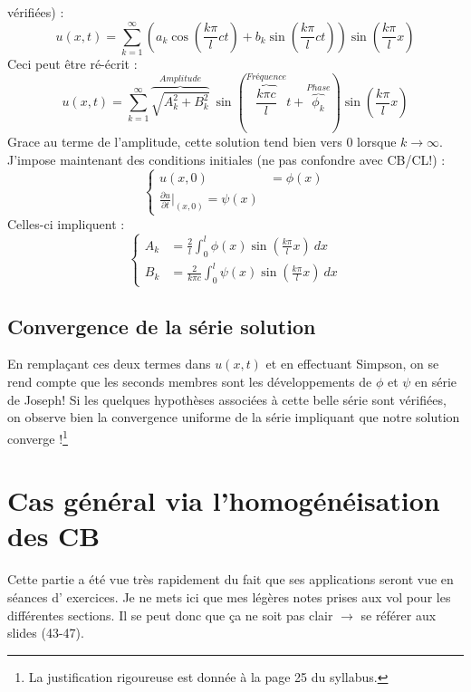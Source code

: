 \documentclass[11pt, a4paper, openany]{book}
\newcommand{\serie}{\sum_{k=1}^\infty}
\begin{document}
			vérifiées) :
			\begin{equation}
				u(x,t) = \serie\left(a_k\cos\left(\frac{k\pi}{l}ct\right)+b_k\sin\left(\frac{k\pi}{l}ct\right)
				\right)\sin\left(\frac{k\pi}{l}x\right)
			\end{equation}
			Ceci peut être ré-écrit :
			\begin{equation}
				u(x,t) = \serie \overbrace{\sqrt{A_k^2 + B_k^2}}^{Amplitude}\ \sin\left(\overbrace{
					\frac{k\pi c}{l}}^{Fréquence}t +\overbrace{\phi_k}^{Phase}\right)\sin\left(\frac{k\pi}{l}
				x\right)
			\end{equation}
			Grace au terme de l'amplitude, cette solution tend bien vers 0 lorsque $k\rightarrow\infty$.\\
			J'impose maintenant des conditions initiales (ne pas confondre avec CB/CL!) :
			\begin{equation}
				\left\{\begin{array}{ll}
				u(x,0) &= \phi(x)\\
				\frac{\partial u}{\partial t}|_{(x,0)} = \psi(x)
				\end{array}\right.
			\end{equation}
			Celles-ci impliquent :
			\begin{equation}
				\left\{\begin{array}{ll}
				A_k &= \frac{2}{l}\int_0^l \phi(x)\sin\left(\frac{k\pi}{l}x\right)\ dx\\
				B_k &= \frac{2}{k\pi c}\int_0^l \psi(x)\sin\left(\frac{k\pi}{l}x\right)\ dx
				\end{array}\right.
			\end{equation}
																
			\subsection{Convergence de la série solution}
			En remplaçant ces deux termes dans $u(x,t)$ et en effectuant Simpson, on se rend compte 
			que les seconds membres sont les développements de $\phi$ et $\psi$ en série de Joseph! 
			Si les quelques hypothèses associées à cette belle série sont vérifiées, on observe bien
			la convergence uniforme de la série impliquant que notre solution converge !\footnote{
			La justification rigoureuse est donnée à la page 25 du syllabus.}
																
																
																
			\section{Cas général via l'homogénéisation des CB}
			Cette partie a été vue très rapidement du fait que ses applications seront vue en séances d'
			exercices. Je ne mets ici que mes légères notes prises aux vol pour les différentes sections.
			Il se peut donc que ça ne soit pas clair $\rightarrow$ se référer aux slides (43-47).
																
\end{document}
